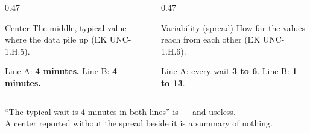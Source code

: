 \documentclass[aspectratio=169, 11pt]{beamer}
\begin{document}
\begin{frame}[t, plain]
  \vspace{4pt}
  \begin{columns}[t]
    \begin{column}{0.47\textwidth}
      \begin{block}{Center}
        The middle, typical value --- where the data pile up (EK UNC-1.H.5).
      \end{block}
      \vspace{4pt}
      {\small Line A: \textbf{4 minutes.} \quad Line B: \textbf{4 minutes.}}
    \end{column}
    \begin{column}{0.47\textwidth}
      \begin{block}{Variability (spread)}
        How far the values reach from each other (EK UNC-1.H.6).
      \end{block}
      \vspace{4pt}
      {\small Line A: every wait \textbf{3 to 6}. \quad Line B: \textbf{1 to 13}.}
    \end{column}
  \end{columns}
  \vspace{12pt}
  \begin{center}
    {\large ``The typical wait is 4 minutes in both lines'' is  --- and useless.}\\[6pt]
    {\small\color{slate} A center reported without the spread beside it is a summary of nothing.}
  \end{center}
\end{frame}
\end{document}

